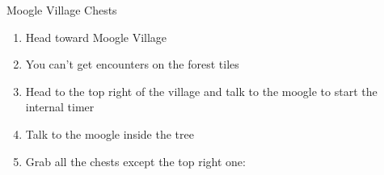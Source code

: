 \begin{paracol}{2}
\switchcolumn*
\begin{misc}{Moogle Village Chests}
\end{misc}

\switchcolumn
\begin{enumerate}[resume]
    \item Head toward Moogle Village
    \item You can't get encounters on the forest tiles
    \item Head to the top right of the village and talk to the moogle to start the internal timer
    \item Talk to the moogle inside the tree
    \item Grab all the chests except the top right one: 
\end{enumerate}

\end{paracol}